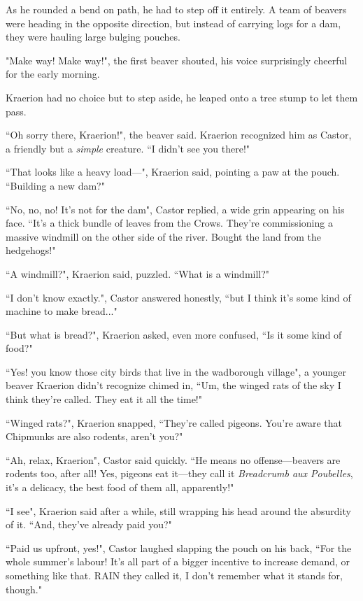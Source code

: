 As he rounded a bend on path, he had to step off it entirely. A team of beavers were heading in the opposite direction, but instead of carrying logs for a dam, they were hauling large bulging pouches.

"Make way! Make way!", the first beaver shouted, his voice surprisingly cheerful for the early morning.

Kraerion had no choice but to step aside, he leaped onto a tree stump to let them pass.

``Oh sorry there, Kraerion!", the beaver said. Kraerion recognized him as Castor, a friendly but a \textit{simple} creature. ``I didn't see you there!"

``That looks like a heavy load---", Kraerion said, pointing a paw at the pouch. ``Building a new dam?"

``No, no, no! It's not for the dam", Castor replied, a wide grin appearing on his face. ``It's a thick bundle of leaves from the Crows. They're commissioning a massive windmill on the other side of the river. Bought the land from the hedgehogs!"

``A windmill?", Kraerion said, puzzled. ``What is a windmill?"

``I don't know exactly.", Castor answered honestly, ``but I think it's some kind of machine to make bread..."

``But what is bread?", Kraerion asked, even more confused, ``Is it some kind of food?"

``Yes! you know those city birds that live in the wadborough village", a younger beaver Kraerion didn't recognize chimed in, ``Um, the winged rats of the sky I think they're called. They eat it all the time!"

``Winged rats?", Kraerion snapped, ``They're called pigeons. You're aware that Chipmunks are also rodents, aren't you?"

``Ah, relax, Kraerion", Castor said quickly. ``He means no offense---beavers are rodents too, after all! Yes, pigeons eat it---they call it \textit{Breadcrumb aux Poubelles}, it's a delicacy, the best food of them all, apparently!"

``I see", Kraerion said after a while, still wrapping his head around the absurdity of it. ``And, they've already paid you?"

``Paid us upfront, yes!", Castor laughed slapping the pouch on his back, ``For the whole summer's labour! It's all part of a bigger incentive to increase demand, or something like that. RAIN they called it, I don't remember what it stands for, though."

